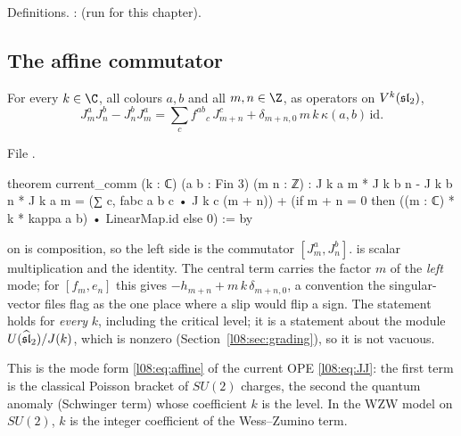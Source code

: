 \begin{status}
Definitions. : \lean{[propext, Classical.}\allowbreak{}\allowbreak\lean{sound]} (run for
this chapter).
\end{status}

\subsection{The affine commutator}

\begin{theorem}\label{l08:thm:currentcomm}
For every $k\in\C$, all colours $a,b$ and all $m,n\in\Z$, as operators on $V^k(\mathfrak{sl}_2)$,
\begin{equation*}
  J^a_mJ^b_n - J^b_nJ^a_m = \sum_c f^{ab}{}_c\,J^c_{m+n} + \delta_{m+n,0}\,m\,k\,\kappa(a,b)\,\mathrm{id}.
\end{equation*}
\end{theorem}

\noindent File .
\begin{leancode}
theorem current_comm (k : ℂ) (a b : Fin 3) (m n : ℤ) :
    J k a m * J k b n - J k b n * J k a m
      = (∑ c, fabc a b c • J k c (m + n))
        + (if m + n = 0 then ((m : ℂ) * k * kappa a b) • LinearMap.id else 0) := by
\end{leancode}

\begin{dictionary}
\lean{*} on \allowbreak{} is composition, so the left side is the commutator
$[J^a_m,J^b_n]$.  is scalar multiplication and  the identity. The central
term carries the factor $m$ of the \emph{left} mode; for $[f_m,e_n]$ this gives
$-h_{m+n}+m\,k\,\delta_{m+n,0}$, a convention the singular-vector files flag as the one place where a
slip would flip a sign. The statement holds for \emph{every} $k$, including the critical level; it is a
statement about the module $U(\widehat{\mathfrak{sl}}_2)/J(k)$, which is nonzero (Section~\ref{l08:sec:grading}),
so it is not vacuous.
\end{dictionary}

\begin{physics}
This is the mode form \eqref{l08:eq:affine} of the current OPE \eqref{l08:eq:JJ}: the first term is the
classical Poisson bracket of $SU(2)$ charges, the second the quantum anomaly (Schwinger term) whose
coefficient $k$ is the level. In the WZW model on $SU(2)$, $k$ is the integer coefficient of the
Wess--Zumino term.
\end{physics}


